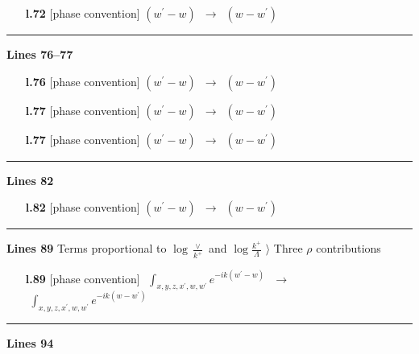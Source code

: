 \documentclass[10pt]{article}
\begin{document}
\begin{itemize}[leftmargin=2.2em,itemsep=1pt,topsep=2pt]
\item[\textbf{l.72}] \textsf{\small [phase convention]} $\displaystyle (w^{\prime}-w)$\ $\longrightarrow$\ $\displaystyle (w-w^{\prime})$
\end{itemize}
\noindent\rule{\linewidth}{0.3pt}\par\noindent\textbf{Lines 76--77} \par
\begin{itemize}[leftmargin=2.2em,itemsep=1pt,topsep=2pt]
\item[\textbf{l.76}] \textsf{\small [phase convention]} $\displaystyle (w^{\prime}-w)$\ $\longrightarrow$\ $\displaystyle (w-w^{\prime})$
\item[\textbf{l.77}] \textsf{\small [phase convention]} $\displaystyle (w^{\prime}-w)$\ $\longrightarrow$\ $\displaystyle (w-w^{\prime})$
\item[\textbf{l.77}] \textsf{\small [phase convention]} $\displaystyle (w^{\prime}-w)$\ $\longrightarrow$\ $\displaystyle (w-w^{\prime})$
\end{itemize}
\noindent\rule{\linewidth}{0.3pt}\par\noindent\textbf{Lines 82} \par
\begin{itemize}[leftmargin=2.2em,itemsep=1pt,topsep=2pt]
\item[\textbf{l.82}] \textsf{\small [phase convention]} $\displaystyle (w^{\prime}-w)$\ $\longrightarrow$\ $\displaystyle (w-w^{\prime})$
\end{itemize}
\noindent\rule{\linewidth}{0.3pt}\par\noindent\textbf{Lines 89} \quad \textsf{Terms proportional to $\log{\frac{\vee}{k^{+}}}$ and $\log{\frac{k^{+}}{\Lambda}}$ $\rangle$ Three $\rho$ contributions} \par
\begin{itemize}[leftmargin=2.2em,itemsep=1pt,topsep=2pt]
\item[\textbf{l.89}] \textsf{\small [phase convention]} $\displaystyle \,\,\int_{x,y,z,x^{\prime},w,w^{\prime}}e^{-ik(w^{\prime}-w)}\,$\ $\longrightarrow$\ $\displaystyle \,\,\int_{x,y,z,x^{\prime},w,w^{\prime}}e^{-ik(w-w^{\prime})}\,$
\end{itemize}
\noindent\rule{\linewidth}{0.3pt}\par\noindent\textbf{Lines 94} \par
\end{document}
